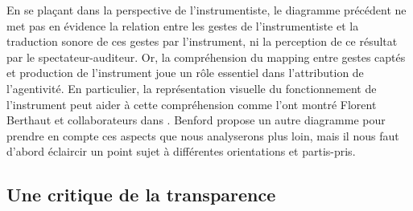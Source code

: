 \indent En se plaçant dans la perspective de l'instrumentiste, le diagramme précédent ne met pas en évidence la relation entre les gestes de l'instrumentiste et la traduction sonore de ces gestes par l'instrument, ni la perception de ce résultat par le spectateur-auditeur. Or, la compréhension du mapping entre gestes captés et production de l'instrument joue un rôle essentiel dans l'attribution de l'agentivité. En particulier, la représentation visuelle du fonctionnement de l'instrument peut aider à cette compréhension comme l'ont montré Florent Berthaut et collaborateurs dans \cite{berthaut_rouages:_2013, berthaut_liveness_2015}. Benford propose un autre diagramme pour prendre en compte ces aspects que nous analyserons plus loin, mais il nous faut d'abord éclaircir un point sujet à différentes orientations et partis-pris.

\subsection{Une critique de la transparence}
\label{sec:gesture:critique_transparency}

